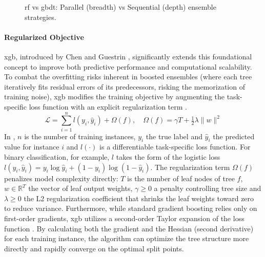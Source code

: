  \begin{figure}[ht]
    \centering
    
    \caption{\acrshort{rf} vs \acrshort{gbdt}: Parallel (breadth) vs Sequential (depth)
   ensemble strategies.}
    \label{fig:rf_vs_boosting}
  \end{figure}

\paragraph{Regularized Objective}
\gls{xgb}, introduced by Chen and Guestrin \parencite{chenXGBoostScalableTree2016}, significantly extends this foundational concept to improve both predictive performance and computational scalability. To combat the overfitting risks inherent in boosted ensembles (where each tree iteratively fits residual errors of its predecessors, risking the memorization of training noise), \gls{xgb} modifies the training objective by augmenting the task-specific loss function with an explicit regularization term \parencite{chenXGBoostScalableTree2016}.
\begin{equation}
  \mathcal{L} = \sum_{i=1}^{n} l(y_i, \hat{y}_i) + \Omega(f), \quad \Omega(f) = \gamma T + \tfrac{1}{2}\lambda \|w\|^2
  \label{eq:xgboost_objective}
\end{equation}
In , $n$ is the number of training instances, $y_i$ the true label and $\hat{y}_i$ the predicted value for instance $i$ and $l(\cdot)$ is a differentiable task-specific loss function. For binary classification, for example, $l$ takes the form of the logistic loss $l(y_i, \hat{y}_i) = y_i \log \hat{y}_i + (1 - y_i)\log(1 - \hat{y}_i)$. The regularization term $\Omega(f)$ penalizes model complexity directly: $T$ is the number of leaf nodes of tree $f$, $w \in \mathbb{R}^T$ the vector of leaf output weights, $\gamma \geq 0$ a penalty controlling tree size and $\lambda \geq 0$ the L2 regularization coefficient that shrinks the leaf weights toward zero to reduce variance. Furthermore, while standard gradient boosting relies only on first-order gradients, \gls{xgb} utilizes a second-order Taylor expansion of the loss function \parencite{chenXGBoostScalableTree2016}. By calculating both the gradient and the Hessian (second derivative) for each training instance, the algorithm can optimize the tree structure more directly and rapidly converge on the optimal split points.

